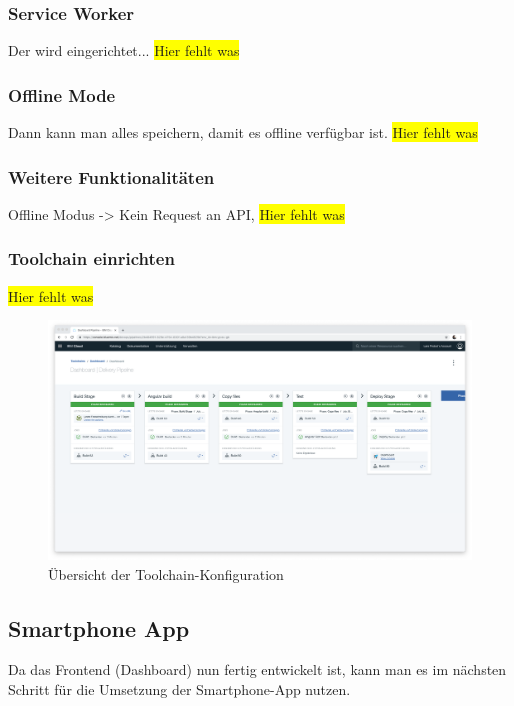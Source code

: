 \subsubsection{Service Worker}
Der wird eingerichtet...
\colorbox{yellow}{Hier fehlt was}

\subsubsection{Offline Mode}
Dann kann man alles speichern, damit es offline verfügbar ist.
\colorbox{yellow}{Hier fehlt was}

\subsubsection{Weitere Funktionalitäten}
Offline Modus -> Kein Request an API,
\colorbox{yellow}{Hier fehlt was}

\subsubsection{Toolchain einrichten}
\colorbox{yellow}{Hier fehlt was}

\begin{figure}[h]
    \centering
    \includegraphics[width=\textwidth]{images/kapitel_4/toolchain_pipeline.png}
    \caption{Übersicht der Toolchain-Konfiguration}
    \label{fig:umsetzung_toolchain_pipeline_frontend}
\end{figure}

\subsection{Smartphone App}
Da das Frontend (Dashboard) nun fertig entwickelt ist, kann man es im nächsten Schritt für die Umsetzung der
Smartphone-App nutzen.

